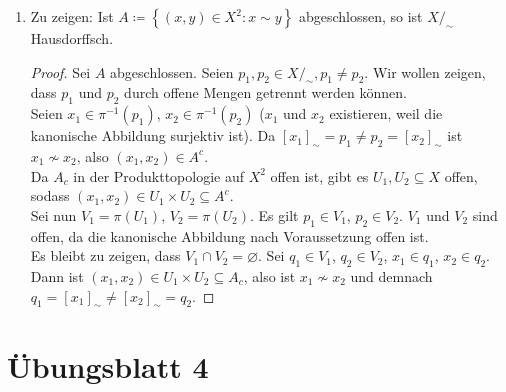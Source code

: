 \begin{solution}
\begin{enumerate}[label= (\alph*)]
    \item Zu zeigen: Ist \( A \coloneqq \left \{ (x,y) \in X^2 : x \sim y \right \} \) abgeschlossen, so ist \( X/_\sim \) Hausdorffsch.
    \begin{proof}
      Sei \( A \) abgeschlossen. Seien \( p_1, p_2 \in X/_\sim, p_1 \neq p_2 \). Wir wollen zeigen, dass \( p_1 \) und \( p_2 \) durch offene Mengen getrennt werden können. \\
      Seien \( x_1 \in \pi^{-1}(p_1) \), \( x_2 \in \pi^{-1}(p_2) \) (\( x_1 \) und \( x_2 \) existieren, weil die kanonische Abbildung surjektiv ist). Da \( {[x_1]}_\sim = p_1 \neq p_2 = {[x_2]}_\sim \) ist \( x_1 \not \sim x_2 \), also \( (x_1, x_2) \in A^c \). \\
      Da \( A_c \) in der Produkttopologie auf \( X^2 \) offen ist, gibt es \( U_1, U_2 \subseteq X \) offen, sodass \( (x_1, x_2) \in U_1 \times U_2 \subseteq A^c \). \\
      Sei nun \( V_1 = \pi(U_1) \), \( V_2 = \pi(U_2) \). Es gilt \( p_1 \in V_1 \), \( p_2 \in V_2 \). \( V_1 \) und \( V_2 \) sind offen, da die kanonische Abbildung nach Voraussetzung offen ist. \\
      Es bleibt zu zeigen, dass \( V_1 \cap V_2 = \varnothing \). Sei \( q_1 \in V_1 \), \( q_2 \in V_2 \), \( x_1 \in q_1 \), \( x_2 \in q_2 \). Dann ist \( (x_1, x_2) \in U_1 \times U_2 \subseteq A_c \), also ist \( x_1 \not \sim x_2 \) und demnach \( q_1 = {[x_1]}_\sim \neq {[x_2]}_\sim = q_2 \).
    \end{proof}
  \end{enumerate}
\end{solution}



% 
\newpage
\setcounter{problemcounter}{0}
\section{Übungsblatt 4}


